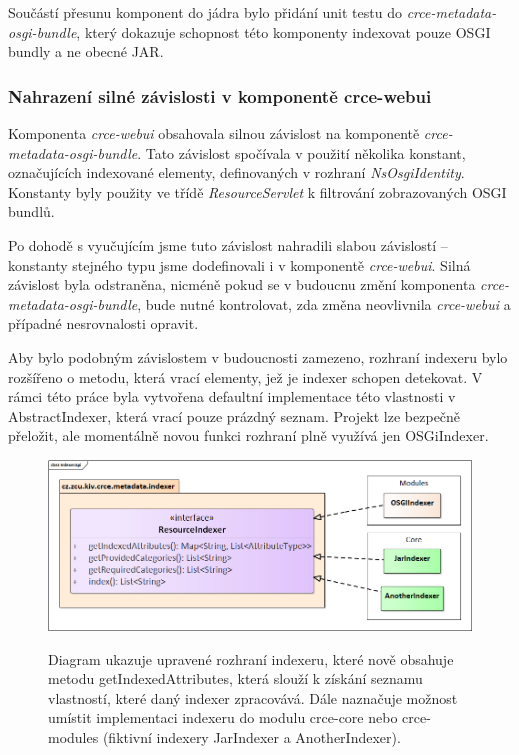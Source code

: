 \documentclass[12pt, a4paper]{article}
\begin{document}
Součástí přesunu komponent do jádra bylo přidání unit testu do \textit{crce-metadata-osgi-bundle}, který dokazuje schopnost této komponenty indexovat pouze OSGI bundly a ne obecné JAR.

\subsubsection{Nahrazení silné závislosti v komponentě crce-webui}
Komponenta \textit{crce-webui} obsahovala silnou závislost na komponentě \textit{crce-metadata-osgi-bundle}. Tato závislost spočívala v použití několika konstant, označujících indexované elementy, definovaných v rozhraní \textit{NsOsgiIdentity}. Konstanty byly použity ve třídě \textit{ResourceServlet} k filtrování zobrazovaných OSGI bundlů. 

Po dohodě s vyučujícím jsme tuto závislost nahradili slabou závislostí -- konstanty stejného typu jsme dodefinovali i v komponentě \textit{crce-webui}. Silná závislost byla odstraněna, nicméně pokud se v budoucnu změní komponenta \textit{crce-metadata-osgi-bundle}, bude nutné kontrolovat, zda změna neovlivnila \textit{crce-webui} a případné nesrovnalosti opravit.

Aby bylo podobným závislostem v budoucnosti zamezeno, rozhraní indexeru bylo rozšířeno o metodu, která vrací elementy, jež je indexer schopen detekovat. V rámci této práce byla vytvořena defaultní implementace této vlastnosti v AbstractIndexer, která vrací pouze prázdný seznam. Projekt lze bezpečně přeložit, ale momentálně novou funkci rozhraní plně využívá jen OSGiIndexer.

\begin{figure}[h!]
\centering
\includegraphics[width=135mm]{indexerApi.png}
\label{fig:indexerApi}
\caption{Diagram ukazuje upravené rozhraní indexeru, které nově obsahuje metodu getIndexedAttributes, která slouží k získání seznamu vlastností, které daný indexer zpracovává. Dále naznačuje možnost umístit implementaci indexeru do modulu crce-core nebo crce-modules (fiktivní indexery JarIndexer a AnotherIndexer).}
\end{figure}
\end{document}
